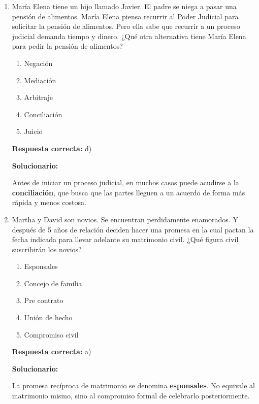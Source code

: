 \begin{enumerate}[resume]
	
	\item María Elena tiene un hijo llamado Javier. El padre se niega a pasar una pensión de alimentos. María Elena piensa recurrir al Poder Judicial para solicitar la pensión de alimentos. Pero ella sabe que recurrir a un proceso judicial demanda tiempo y dinero. ¿Qué otra alternativa tiene María Elena para pedir la pensión de alimentos?
	\begin{enumerate}[label=\alph*)]
		\item Negación
		\item Mediación
		\item Arbitraje
		\item Conciliación
		\item Juicio
	\end{enumerate}
	\textbf{Respuesta correcta:} d)
	
	\vspace{2mm}
	\textbf{Solucionario:}
	
	Antes de iniciar un proceso judicial, en muchos casos puede acudirse a la \textbf{conciliación}, que busca que las partes lleguen a un acuerdo de forma más rápida y menos costosa.
	
	\vspace{6mm}
	
	\item Martha y David son novios. Se encuentran perdidamente enamorados. Y después de 5 años de relación deciden hacer una promesa en la cual pactan la fecha indicada para llevar adelante su matrimonio civil. ¿Qué figura civil suscribirán los novios?
	\begin{enumerate}[label=\alph*)]
		\item Esponsales
		\item Concejo de familia
		\item Pre contrato
		\item Unión de hecho
		\item Compromiso civil
	\end{enumerate}
	\textbf{Respuesta correcta:} a)
	
	\vspace{2mm}
	\textbf{Solucionario:}
	
	La promesa recíproca de matrimonio se denomina \textbf{esponsales}. No equivale al matrimonio mismo, sino al compromiso formal de celebrarlo posteriormente.
	
	\vspace{6mm}
	

\end{enumerate}
